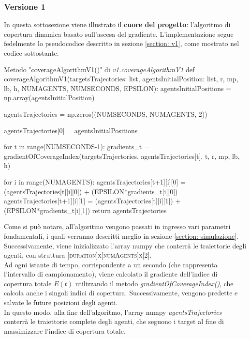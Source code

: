 \documentclass[twoside]{article}
\begin{document}
\subsubsection{Versione 1}
In questa sottosezione viene illustrato il \textbf{cuore del progetto}: l'algoritmo di copertura dinamica basato sull'ascesa del gradiente. L'implementazione segue fedelmente lo pseudocodice descritto in sezione \ref{section: v1}, come mostrato nel codice sottostante.

\begin{code}{Metodo "coverageAlgorithmV1()" di \textit{v1.coverageAlgorithmV1}}
def coverageAlgorithmV1(targetsTrajectories: list, agentsInitialPosition: list, r, mp, lb, h, NUMAGENTS, NUMSECONDS, EPSILON):
    agentsInitialPositions = np.array(agentsInitialPosition)
    
    agentsTrajectories = np.zeros((NUMSECONDS, NUMAGENTS, 2))  
    
    agentsTrajectories[0] = agentsInitialPositions
    
    for t in range(NUMSECONDS-1): 
        gradients_t = gradientOfCoverageIndex(targetsTrajectories, agentsTrajectories[t], t, r, mp, lb, h)
        
        for i in range(NUMAGENTS):
            agentsTrajectories[t+1][i][0] = (agentsTrajectories[t][i][0]) + (EPSILON*gradients_t[i][0])
            agentsTrajectories[t+1][i][1] = (agentsTrajectories[t][i][1]) + (EPSILON*gradients_t[i][1])
    return agentsTrajectories
\end{code}

Come si può notare, all'algoritmo vengono passati in ingresso vari parametri fondamentali, i quali verranno descritti meglio in sezione \ref{section: simulazione}. Successivamente, viene inizializzato l'array numpy che conterrà le traiettorie degli agenti, con struttura \textsc{[duration]x[numAgents]x[2]}.\\
Ad ogni istante di tempo, corrispondente a un secondo (che rappresenta l'intervallo di campionamento), viene calcolato il gradiente dell'indice di copertura totale \(E(t)\) utilizzando il metodo \textit{gradientOfCoverageIndex()}, che calcola anche i singoli indici di copertura. Successivamente, vengono predette e salvate le future posizioni degli agenti.\\
In questo modo, alla fine dell'algoritmo, l'array numpy \textit{agentsTrajectories} conterrà le traiettorie complete degli agenti, che seguono i target al fine di massimizzare l'indice di copertura totale.
\end{document}
